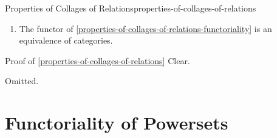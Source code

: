 \begin{proposition}{Properties of Collages of Relations}{properties-of-collages-of-relations}
\begin{enumerate}
\begin{itemize}
\[                        R%
                        \subset%
                        S%
                    \]%
                    to the morphism
                    \[
                        \eColl(\iota)%
                        \colon%
                        \eColl(R)%
                        \to%
                        \eColl(S)%
                    \]%
                    of posets over $\Delta^{1}$ defined by
                    \[
                        [\eColl(\iota)](x)%
                        \defeq%
                        x%
                    \]%
                    for each $x\in\eColl(R)$.%
                    \footnote{%
                        Note that this is indeed a morphism of posets: if $x\preceq_{\eColl(R)}y$, then $x=y$ or $x\sim_{R}y$, so we have either $x=y$ or $x\sim_{S}y$ (as $R\subset S$), and thus $x\preceq_{\eColl(S)}y$.
                        \par\vspace*{-1.75\baselineskip}
                    }%
            \end{itemize}
        \item\label{properties-of-collages-of-relations-equivalence}The functor of \cref{properties-of-collages-of-relations-functoriality} is an equivalence of categories.
    \end{enumerate}
\end{proposition}
\begin{Proof}{Proof of \cref{properties-of-collages-of-relations}}%
    Clear.

    Omitted.
\end{Proof}
\section{Functoriality of Powersets}\label{section-functoriality-of-powersets}

